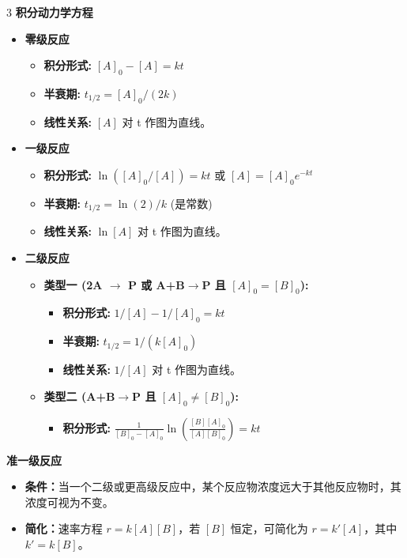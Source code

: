 \documentclass[a4paper,6pt]{article} %
\begin{document}
\begin{multicols}{3}
\textbf{积分动力学方程}
\begin{itemize}
    \item \textbf{零级反应}
    \begin{itemize}
        \item \textbf{积分形式:} $[A]_0 - [A] = kt$
        \item \textbf{半衰期:} $t_{1/2} = [A]_0 / (2k)$
        \item \textbf{线性关系:} $[A]$ 对 t 作图为直线。
    \end{itemize}
    \item \textbf{一级反应}
    \begin{itemize}
        \item \textbf{积分形式:} $\ln([A]_0 / [A]) = kt$ 或 $[A] = [A]_0e^{-kt}$
        \item \textbf{半衰期:} $t_{1/2} = \ln(2) / k$ (是常数)
        \item \textbf{线性关系:} $\ln[A]$ 对 t 作图为直线。
    \end{itemize}
    \item \textbf{二级反应}
    \begin{itemize}
        \item \textbf{类型一 (2A $\to$ P 或 A+B$\to$P 且 $[A]_0=[B]_0$):}
        \begin{itemize}
            \item \textbf{积分形式:} $1/[A] - 1/[A]_0 = kt$
            \item \textbf{半衰期:} $t_{1/2} = 1 / (k[A]_0)$
            \item \textbf{线性关系:} $1/[A]$ 对 t 作图为直线。
        \end{itemize}
        \item \textbf{类型二 (A+B$\to$P 且 $[A]_0\neq[B]_0$):}
        \begin{itemize}
            \item \textbf{积分形式:} $\frac{1}{[B]_0-[A]_0} \ln\left( \frac{[B][A]_0}{[A][B]_0} \right) = kt$
        \end{itemize}
    \end{itemize}
\end{itemize}

\textbf{准一级反应}
\begin{itemize}
    \item \textbf{条件：}当一个二级或更高级反应中，某个反应物浓度远大于其他反应物时，其浓度可视为不变。
    \item \textbf{简化：}速率方程 $r = k[A][B]$，若 $[B]$ 恒定，可简化为 $r = k'[A]$，其中 $k' = k[B]$。
\end{itemize}


\end{multicols}
\end{document}
